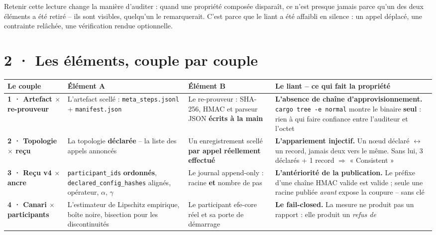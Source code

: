 \documentclass[10pt]{article}
\newcommand{\code}[1]{\texttt{\small #1}}
\newcommand{\x}{$\times$}
\begin{document}
Retenir cette lecture change la manière d'auditer : quand une propriété composée disparaît, ce n'est
presque jamais parce qu'un des deux éléments a été retiré -- ils sont visibles, quelqu'un le
remarquerait. C'est parce que le liant a été affaibli en silence : un appel déplacé, une contrainte
relâchée, une vérification rendue optionnelle.

\section{2 · Les éléments, couple par couple}

\renewcommand{\arraystretch}{1.25}
\begin{center}\footnotesize
\begin{tabular}{@{}>{\raggedright\arraybackslash}p{2.75cm} >{\raggedright\arraybackslash}p{4.05cm} >{\raggedright\arraybackslash}p{4.05cm} >{\raggedright\arraybackslash}p{5.15cm}@{}}
\toprule
\textbf{Le couple} & \textbf{Élément A} & \textbf{Élément B} & \textbf{Le liant -- ce qui fait la propriété} \\
\midrule
\textbf{1 · Artefact \x{} re-prouveur} &
  L'artefact scellé : \code{meta\_steps.jsonl} + \code{manifest.json} &
  Le re-prouveur : SHA-256, HMAC et parseur JSON \textbf{écrits à la main} &
  \textbf{L'absence de chaîne d'approvisionnement.} \code{cargo tree -e normal} montre le binaire
  \textbf{seul} : rien à qui faire confiance entre l'auditeur et l'octet \\
\textbf{2 · Topologie \x{} reçu} &
  La topologie \textbf{déclarée} -- la liste des appels annoncés &
  Un enregistrement scellé \textbf{par appel réellement effectué} &
  \textbf{L'appariement injectif.} Un n\oe ud déclaré $\leftrightarrow$ un record, jamais deux vers le
  même. Sans lui, 3 déclarés + 1 record $\Rightarrow$ « Consistent » \\
\textbf{3 · Reçu v4 \x{} ancre} &
  \code{participant\_ids} \textbf{ordonnés}, \code{declared\_config\_hashes} alignés, opérateur,
  $\alpha$, $\gamma$ &
  Le journal append-only : racine \textbf{et} nombre de pas &
  \textbf{L'antériorité de la publication.} Le préfixe d'une chaîne HMAC valide est valide ; seule une
  racine publiée \emph{avant} expose la coupure -- sans clé \\
\textbf{4 · Canari \x{} participants} &
  L'estimateur de Lipschitz empirique, boîte noire, bisection pour les discontinuités &
  Le participant efe-core réel et sa porte de démarrage &
  \textbf{Le fail-closed.} La mesure ne produit pas un rapport : elle produit un \emph{refus de
}
\end{tabular}
\end{center}
\end{document}
